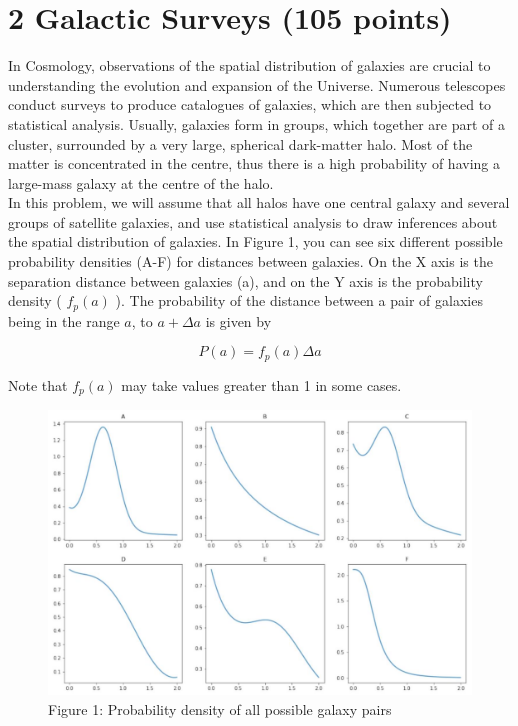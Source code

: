 \documentclass[10pt]{article}
\begin{document}
\section*{2 Galactic Surveys (105 points)}
In Cosmology, observations of the spatial distribution of galaxies are crucial to understanding the evolution and expansion of the Universe. Numerous telescopes conduct surveys to produce catalogues of galaxies, which are then subjected to statistical analysis. Usually, galaxies form in groups, which together are part of a cluster, surrounded by a very large, spherical dark-matter halo. Most of the matter is concentrated in the centre, thus there is a high probability of having a large-mass galaxy at the centre of the halo.\\
In this problem, we will assume that all halos have one central galaxy and several groups of satellite galaxies, and use statistical analysis to draw inferences about the spatial distribution of galaxies. In Figure 1, you can see six different possible probability densities (A-F) for distances between galaxies. On the X axis is the separation distance between galaxies (a), and on the Y axis is the probability density ( $f_{p}(a)$ ). The probability of the distance between a pair of galaxies being in the range $a$, to $a+\Delta a$ is given by

$$
P(a)=f_{p}(a) \Delta a
$$

Note that $f_{p}(a)$ may take values greater than 1 in some cases.

\begin{figure}[h]
\begin{center}
  \includegraphics[width=\textwidth]{2025_09_11_3681df2e94a9f94ef296g-4}
\captionsetup{labelformat=empty}
\caption{Figure 1: Probability density of all possible galaxy pairs}
\end{center}
\end{figure}
\end{document}
